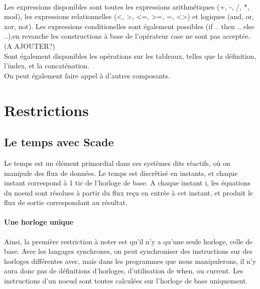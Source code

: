 \paragraph{}
Les expressions disponibles sont toutes les expressions arithmétiques
(+, -, /, *, mod), les expressions relationnelles (<, >, <=, >=, =, <>)
et logiques (and, or, xor, not).
Les expressions conditionelles sont également possibles (if .. then
.. else ..),en revanche les constructions à base de l'opérateur case
ne sont pas acceptée. (A AJOUTER?) \\
Sont également disponibles les opérations sur les tableaux, telles que
la définition, l'index, et la concaténation.\\
On peut également faire appel à d'autres composants.


\section{Restrictions}

\subsection{Le temps avec Scade}

Le temps est un élément primordial dans ces systèmes dits réactifs, où
on manipule des flux de données. Le temps est discrêtisé en instants,
et chaque instant correspond à 1 tic de l'horloge de base. A chaque
instant i, les équations du noeud sont résolues à partir du flux reçu
en entrée à cet instant, et produit le flux de sortie correspondant au
résultat.

\paragraph{Une horloge unique}
Ainsi, la première restriction à noter est qu'il n'y a qu'une seule
horloge, celle de base. Avec les langages synchrones, on peut
synchroniser des instructions sur des horloges différentes avec, mais
dans les programmes que nous manipulerons, il n'y aura donc pas de
définitions d'horloges, d'utilisation de when, ou current. Les
instructions d'un noeud sont toutes calculées sur l'horloge de base
uniquement. 

